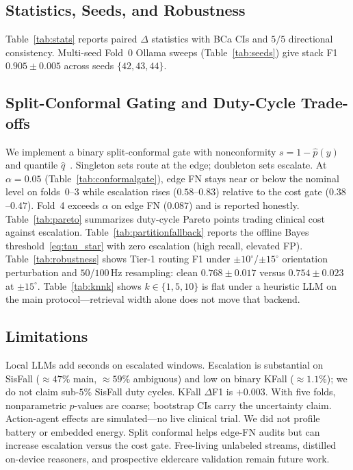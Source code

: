 \documentclass[journal]{IEEEtran}
\begin{document}
\subsection{Statistics, Seeds, and Robustness}
Table~\ref{tab:stats} reports paired $\Delta$ statistics with BCa CIs and $5/5$ directional consistency. Multi-seed Fold~0 Ollama sweeps (Table~\ref{tab:seeds}) give stack F1 $0.905{\pm}0.005$ across seeds $\{42,43,44\}$.

\subsection{Split-Conformal Gating and Duty-Cycle Trade-offs}
\label{sec:conformal}
We implement a binary split-conformal gate with nonconformity $s=1-\hat{p}(y)$ and quantile $\hat{q}$~\cite{vovk2005algorithmic,angelopoulos2023gentle}. Singleton sets route at the edge; doubleton sets escalate. At $\alpha{=}0.05$ (Table~\ref{tab:conformalgate}), edge FN stays near or below the nominal level on folds~0--3 while escalation rises ($0.58$--$0.83$) relative to the cost gate ($0.38$--$0.47$). Fold~4 exceeds $\alpha$ on edge FN ($0.087$) and is reported honestly. Table~\ref{tab:pareto} summarizes duty-cycle Pareto points trading clinical cost against escalation. Table~\ref{tab:partitionfallback} reports the offline Bayes threshold~\eqref{eq:tau_star} with zero escalation (high recall, elevated FP). Table~\ref{tab:robustness} shows Tier-1 routing F1 under $\pm 10^\circ$/$\pm 15^\circ$ orientation perturbation and $50$/$100$\,Hz resampling: clean $0.768{\pm}0.017$ versus $0.754{\pm}0.023$ at $\pm 15^\circ$. Table~\ref{tab:knnk} shows $k\in\{1,5,10\}$ is flat under a heuristic LLM on the main protocol---retrieval width alone does not move that backend.








\subsection{Limitations}
Local LLMs add seconds on escalated windows. Escalation is substantial on SisFall ($\approx 47\%$ main, $\approx 59\%$ ambiguous) and low on binary KFall ($\approx 1.1\%$); we do not claim sub-$5\%$ SisFall duty cycles. KFall $\Delta$F1 is $+0.003$. With five folds, nonparametric $p$-values are coarse; bootstrap CIs carry the uncertainty claim. Action-agent effects are simulated---no live clinical trial. We did not profile battery or embedded energy. Split conformal helps edge-FN audits but can increase escalation versus the cost gate. Free-living unlabeled streams, distilled on-device reasoners, and prospective eldercare validation remain future work.
\end{document}
